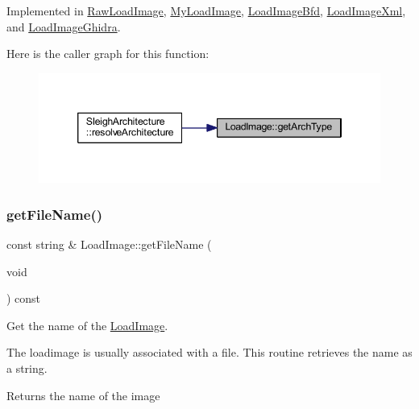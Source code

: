 Implemented in \mbox{\hyperlink{class_raw_load_image_af6696aae484080c76a2fd0b059aa27c8}{Raw\+Load\+Image}}, \mbox{\hyperlink{class_my_load_image_aae5307e132d6736494b7da8ace1b41f1}{My\+Load\+Image}}, \mbox{\hyperlink{class_load_image_bfd_a20f8ec53008fada4bd5c8e4d2d712ca9}{Load\+Image\+Bfd}}, \mbox{\hyperlink{class_load_image_xml_ad6b8dd51035746be7a59e1070e65c668}{Load\+Image\+Xml}}, and \mbox{\hyperlink{class_load_image_ghidra_aa7df1ff6995b047b625f104053f71e47}{Load\+Image\+Ghidra}}.

Here is the caller graph for this function\+:
\nopagebreak
\begin{figure}[H]
\begin{center}
\leavevmode
\includegraphics[width=346pt]{class_load_image_a5103418147e95994f66e77746c0a0cfc_icgraph}
\end{center}
\end{figure}
\mbox{\label{class_load_image_add06668a3a1b9c47ed9fe671b656b4a4}} 
\subsubsection{\texorpdfstring{getFileName()}{getFileName()}}
{\footnotesize\ttfamily const string \& Load\+Image\+::get\+File\+Name (\begin{DoxyParamCaption}\item[{void}]{ }\end{DoxyParamCaption}) const\hspace{0.3cm}{\ttfamily [inline]}}



Get the name of the \mbox{\hyperlink{class_load_image}{Load\+Image}}. 

The loadimage is usually associated with a file. This routine retrieves the name as a string. \begin{DoxyReturn}{Returns}
the name of the image 
\end{DoxyReturn}


